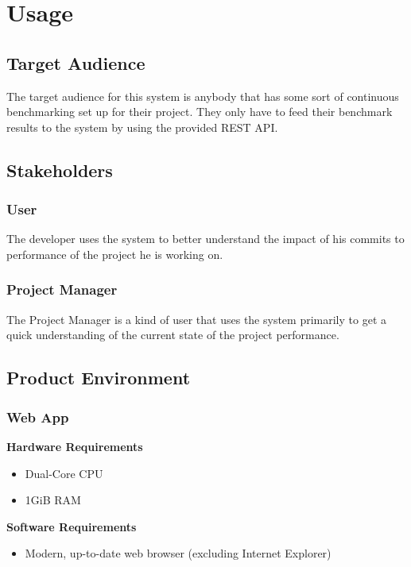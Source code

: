 \section{Usage}

\subsection{Target Audience}

The target audience for this system is anybody that has some sort of continuous benchmarking set up for their project. They only have to feed their benchmark results to the system by using the provided \gls{REST API}.

\subsection{Stakeholders}

\subsubsection*{User}

The developer uses the system to better understand the impact of his commits to performance of the project he is working on. 

\subsubsection*{Project Manager}

The Project Manager is a kind of user that uses the system primarily to get a quick understanding of the current state of the project performance.

\subsection{Product Environment}

\subsubsection*{Web App}

\textbf{Hardware Requirements}
\begin{itemize}
    \item Dual-Core CPU
    \item 1GiB RAM
\end{itemize}

\textbf{Software Requirements}
\begin{itemize}
    \item Modern, up-to-date web browser (excluding Internet Explorer)
\end{itemize}


